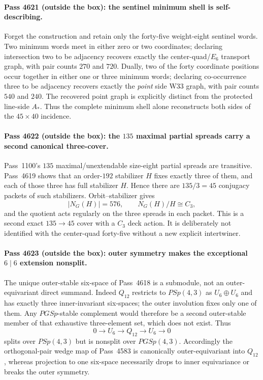 \paragraph{Pass 4621 (outside the box): the sentinel minimum shell is self-describing.}
Forget the construction and retain only the forty-five weight-eight sentinel
words.  Two minimum words meet in either zero or two coordinates; declaring
intersection two to be adjacency recovers exactly the center-quad/$E_6$
transport graph, with pair counts $270$ and $720$.  Dually, two of the forty
coordinate positions occur together in either one or three minimum words;
declaring co-occurrence three to be adjacency recovers exactly the \emph{point}
side W33 graph, with pair counts $540$ and $240$.  The recovered point graph is
explicitly distinct from the protected line-side $A_*$.  Thus the complete
minimum shell alone reconstructs both sides of the $45\times40$ incidence.

\paragraph{Pass 4622 (outside the box): the $135$ maximal partial spreads carry a second canonical three-cover.}
Pass~1100's $135$ maximal/unextendable size-eight partial spreads are transitive.
Pass~4619 shows that an order-$192$ stabilizer $H$ fixes exactly three of them,
and each of those three has full stabilizer $H$.  Hence there are
$135/3=45$ conjugacy packets of such stabilizers.  Orbit--stabilizer gives
\[
 |N_G(H)|=576,\qquad N_G(H)/H\cong C_3,
\]
and the quotient acts regularly on the three spreads in each packet.  This is a
second exact $135\to45$ cover with a $C_3$ deck action.  It is deliberately not
identified with the center-quad forty-five without a new explicit intertwiner.

\paragraph{Pass 4623 (outside the box): outer symmetry makes the exceptional $6\mid6$ extension nonsplit.}
The unique outer-stable six-space of Pass~4618 is a submodule, not an
outer-equivariant direct summand.  Indeed $Q_{12}$ restricts to $PSp(4,3)$ as
$U_6\oplus U_6$ and has exactly three inner-invariant six-spaces; the outer
involution fixes only one of them.  Any $PGSp$-stable complement would therefore
be a second outer-stable member of that exhaustive three-element set, which does
not exist.  Thus
\[
 \boxed{0\longrightarrow U_6\longrightarrow Q_{12}
        \longrightarrow U_6\longrightarrow0}
\]
splits over $PSp(4,3)$ but is nonsplit over $PGSp(4,3)$.  Accordingly the
orthogonal-pair wedge map of Pass~4583 is canonically outer-equivariant into
$Q_{12}$, whereas projection to one six-space necessarily drops to inner
equivariance or breaks the outer symmetry.

